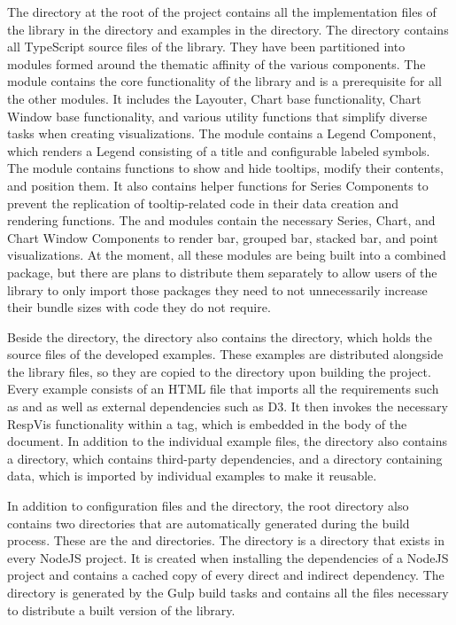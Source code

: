 The  directory at the root of the project contains all the
implementation files of the library in the  directory
and examples in the  directory.  The
 directory contains all TypeScript source files of the
library.  They have been partitioned into modules formed around the
thematic affinity of the various components.  The  module
contains the core functionality of the library and is a prerequisite
for all the other modules.  It includes the Layouter, Chart base
functionality, Chart Window base functionality, and various utility
functions that simplify diverse tasks when creating visualizations.
The  module contains a Legend Component, which renders a
Legend consisting of a title and configurable labeled symbols.  The
 module contains functions to show and hide tooltips,
modify their contents, and position them.  It also contains helper
functions for Series Components to prevent the replication of
tooltip-related code in their data creation and rendering functions.
The  and  modules contain the necessary
Series, Chart, and Chart Window Components to render bar, grouped bar,
stacked bar, and point visualizations.  At the moment, all these
modules are being built into a combined package, but there are plans
to distribute them separately to allow users of the library to only
import those packages they need to not unnecessarily increase their
bundle sizes with code they do not require.

Beside the  directory, the  directory also
contains the  directory, which holds the source
files of the developed examples.  These examples are distributed
alongside the library files, so they are copied to the
 directory upon building the project.  Every
example consists of an HTML file that imports all the requirements
such as  and  as well as external
dependencies such as D3.  It then invokes the necessary RespVis
functionality within a  tag, which is embedded in the
body of the document.  In addition to the individual example files,
the  directory also contains a  directory,
which contains third-party dependencies, and a  directory
containing data, which is imported by individual examples to make it
reusable.

In addition to configuration files and the  directory, the root directory also contains two directories that are automatically generated during the build process.
These are the  and  directories.
The  directory is a directory that exists in every NodeJS project.
It is created when installing the dependencies of a NodeJS project and contains a cached copy of every direct and indirect dependency.
The  directory is generated by the Gulp build tasks and contains all the files necessary to distribute a built version of the library.

